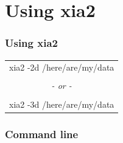 \documentclass[slides,compress]{beamer}
\begin{document}
\section{Using xia2}

\begin{frame}
\frametitle{Using xia2}
\begin{center}
\begin{tabular}{c}
{\huge
xia2 -2d /here/are/my/data
}\\
\\
{\huge \emph{- or -}} \\
\\
{\huge
xia2 -3d /here/are/my/data
}\\
\end{tabular}
\end{center}
\end{frame}

\begin{frame}
\frametitle{Command line}
\end{frame}
\end{document}
